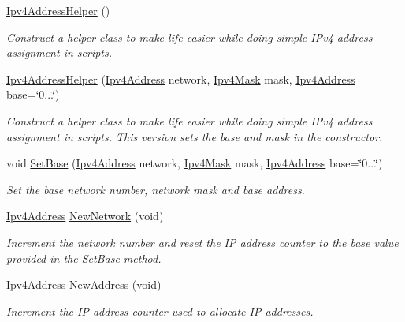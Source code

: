 \begin{DoxyCompactItemize}
\item 
\hyperlink{classns3_1_1Ipv4AddressHelper_abc942a52a319a5c6d13c47ce4de3e584}{Ipv4\+Address\+Helper} ()
\begin{DoxyCompactList}\small\item\em Construct a helper class to make life easier while doing simple I\+Pv4 address assignment in scripts. \end{DoxyCompactList}\item 
\hyperlink{classns3_1_1Ipv4AddressHelper_a3b4480070c6c876604555c2efaabdc26}{Ipv4\+Address\+Helper} (\hyperlink{classns3_1_1Ipv4Address}{Ipv4\+Address} network, \hyperlink{classns3_1_1Ipv4Mask}{Ipv4\+Mask} mask, \hyperlink{classns3_1_1Ipv4Address}{Ipv4\+Address} base=\char`\"{}0...\char`\"{})
\begin{DoxyCompactList}\small\item\em Construct a helper class to make life easier while doing simple I\+Pv4 address assignment in scripts. This version sets the base and mask in the constructor. \end{DoxyCompactList}\item 
void \hyperlink{classns3_1_1Ipv4AddressHelper_acf7b16dd25bac67e00f5e25f90a9a035}{Set\+Base} (\hyperlink{classns3_1_1Ipv4Address}{Ipv4\+Address} network, \hyperlink{classns3_1_1Ipv4Mask}{Ipv4\+Mask} mask, \hyperlink{classns3_1_1Ipv4Address}{Ipv4\+Address} base=\char`\"{}0...\char`\"{})
\begin{DoxyCompactList}\small\item\em Set the base network number, network mask and base address. \end{DoxyCompactList}\item 
\hyperlink{classns3_1_1Ipv4Address}{Ipv4\+Address} \hyperlink{classns3_1_1Ipv4AddressHelper_a3277d133ef0d2669934a16a8206ba8e4}{New\+Network} (void)
\begin{DoxyCompactList}\small\item\em Increment the network number and reset the IP address counter to the base value provided in the Set\+Base method. \end{DoxyCompactList}\item 
\hyperlink{classns3_1_1Ipv4Address}{Ipv4\+Address} \hyperlink{classns3_1_1Ipv4AddressHelper_a9d6bc3cd8def204f9c253fce666b2edd}{New\+Address} (void)
\begin{DoxyCompactList}\small\item\em Increment the IP address counter used to allocate IP addresses. \end{DoxyCompactList}\item 

\end{DoxyCompactItemize}
